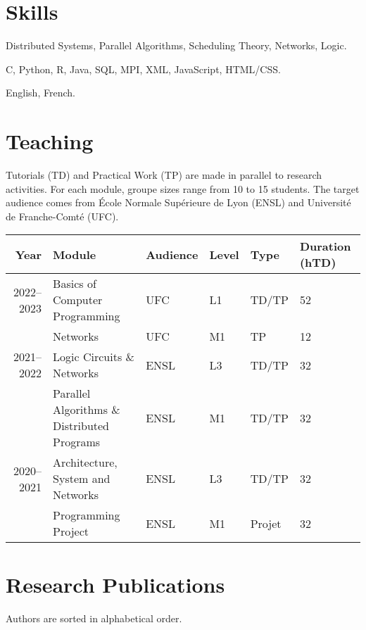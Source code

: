 \documentclass[12pt]{article}
\newcounter{cvitems}
\newcommand{\cvitem}[2]{\item[#1] #2}
\begin{document}
\section*{Skills}

\begin{cvitems}
  \cvitem{Academic}{Distributed Systems, Parallel Algorithms, Scheduling Theory, Networks, Logic.}

  \cvitem{Technical}{C, Python, R, Java, SQL, MPI, XML, JavaScript, HTML/CSS.}

  \cvitem{Language}{English, French.}
\end{cvitems}

\section*{Teaching}

Tutorials (TD) and Practical Work (TP) are made in parallel to research activities.  
For each module, groupe sizes range from 10 to 15 students.  
The target audience comes from École Normale Supérieure de Lyon (ENSL) and Université de
Franche-Comté (UFC).

\begin{center}
  \footnotesize
  \begin{tabularx}{\textwidth}{rXllll}
    \toprule
    Year & Module & Audience & Level & Type & Duration (hTD) \tabularnewline
    \midrule
    2022--2023 & Basics of Computer Programming & UFC & L1 & TD/TP & 52 \tabularnewline
    & Networks & UFC & M1 & TP & 12 \tabularnewline
    \midrule
    2021--2022 & Logic Circuits \& Networks & ENSL & L3 & TD/TP & 32 \tabularnewline
    & Parallel Algorithms \& Distributed Programs & ENSL & M1 & TD/TP & 32 \tabularnewline
    \midrule
    2020--2021 & Architecture, System and Networks & ENSL & L3 & TD/TP & 32 \tabularnewline
    & Programming Project & ENSL & M1 & Projet & 32 \tabularnewline
    \bottomrule
  \end{tabularx}
\end{center}

\section*{Research Publications}

Authors are sorted in alphabetical order.

\nocite{*}

\newcommand{\showbib}[1]{%
  \begin{otherlanguage}{english}
    \printbibliography[heading=none,keyword={#1}]
  \end{otherlanguage}}
\end{document}
